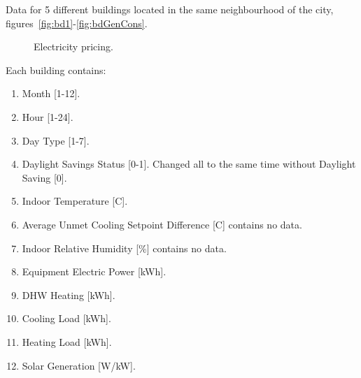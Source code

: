 \documentclass{article}
\numberwithin{equation}{subsection}
\begin{document}
\begin{itemize}
		
	Data for 5 different buildings located in the same neighbourhood of the city, figures~\ref{fig:bd1}-\ref{fig:bdGenCons}. 
		\begin{figure}[H]
		\centering	
			 \quad
		\caption{\small Electricity pricing.}
	\end{figure}
		Each building contains:
		\begin{enumerate}
			\item Month	[1-12].
			\item Hour	[1-24].
			\item Day Type	[1-7].
			\item Daylight Savings Status  [0-1]. Changed all to the same time without Daylight Saving [0]. 
			\item Indoor Temperature [C].
			\item Average Unmet Cooling Setpoint Difference [C]	contains no data.
			\item Indoor Relative Humidity [\%]	contains no data.
			\item Equipment Electric Power [kWh].
			\item DHW Heating [kWh].
			\item Cooling Load [kWh].
			\item Heating Load [kWh].
			\item Solar Generation [W/kW].
		\end{enumerate}
		
		


		
		
		
\end{itemize}
\end{document}
